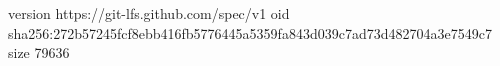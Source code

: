 version https://git-lfs.github.com/spec/v1
oid sha256:272b57245fcf8ebb416fb5776445a5359fa843d039c7ad73d482704a3e7549c7
size 79636
